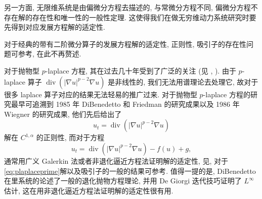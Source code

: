 \documentclass[oneside,longtitle]{LZUthesis}
\theoremstyle{definition}
\numberwithin{equation}{chapter}
\newcommand*\abs[1]{\lvert#1\rvert}
\DeclareMathOperator{\Div}{div}
\begin{document}
另一方面, 无限维系统是由偏微分方程去描述的, 与常微分方程不同, 偏微分方程不存在解的存在性和唯一性的一般性定理.
这使得我们在做无穷维动力系统研究时要先得到对应发展方程解的适定性.

对于经典的带有二阶微分算子的发展方程解的适定性, 正则性, 吸引子的存在性问题可参考\citep{taylorPartialDifferentialEquations2011,temamInfiniteDimensionalDynamicalSystems1997},
在此不再赘述.

对于抛物型 $p$-laplace 方程, 其在过去几十年受到了广泛的关注
(见 \citep{liuAsymptoticRegularityPLaplacian2010,zhongZ2IndexGlobal2010,acerbiRegularityResultsStationary2002,rajagopalMathematicalModelingElectrorheological2001,aboulaichNewDiffusionModels2008,guoSingularPhenomenaSolutions2015,antontsevUniquenessComparisonTheorems2013,gaoExistenceUniquenessNonexistence2016,liuNonlinearDiffusionProblem2019,guoStudyWeakSolutions2011,antontsevParabolicEquationsAnisotropic2007,constantinGlobalExistenceFully2006,constantinGlobalSolutionsQuasilinear2002},
). 由于 $p$-laplace 算子 $\Div(\abs{\nabla u}^{p-2}\nabla u)$ 是非线性的, 我们无法用谱理论去处理它, 故对于很多 laplace 算子对应的结果无法轻易的推广过来.
对于抛物型 $p$-laplace 方程的研究最早可追溯到 1985 年 DiBenedetto 和 Friedman 的研究成果以及 1986 年 Wiegner 的研究成果,
他们先后给出了
\begin{equation*}
	u_t = \Div(\abs{\nabla u}^{p - 2}\nabla u)
\end{equation*}
解在 $C^{1, \alpha}$ 的正则性, 而对于方程
\begin{equation}\label{eq:plaplaceprime}
	u_t = \Div(\abs{\nabla u}^{p - 2}\nabla u) - f(u) + g,
\end{equation}
通常用广义 Galerkin 法或者非退化逼近方程法证明解的适定性, 见\citep{babinAttractorsEvolutionEquations1992a},
对于\cref{eq:plaplaceprime}解以及吸引子的一般的结果可参考\citep{efendievAttractorsDegenerateParabolic2013b}.
值得一提的是, DiBenedetto 在\citep{dibenedettoDegenerateParabolicEquations1993a}里系统的论述了一般的退化抛物方程理论,
并用 De Giorgi 迭代技巧证明了 $L^\infty$ 估计, 这在用非退化逼近方程法证明解的适定性很有用.
\end{document}
